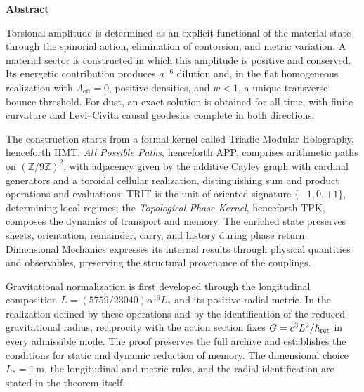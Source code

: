
\begin{center}\bfseries Abstract\end{center}
\begingroup
\fontsize{9.5}{10.7}\selectfont
\setlength{\parskip}{1.5pt plus .5pt minus .5pt}
\noindent
Torsional amplitude is determined as an explicit functional of the
material state through the spinorial action, elimination of contorsion,
and metric variation. A material sector is constructed in which this
amplitude is positive and conserved. Its energetic contribution produces
\(a^{-6}\) dilution and, in the flat homogeneous realization with
\(\Lambda_{\mathrm{eff}}=0\), positive densities, and \(w<1\), a unique
transverse bounce threshold. For dust, an exact solution is obtained for
all time, with finite curvature and Levi--Civita causal geodesics complete
in both directions.

The construction starts from a formal kernel called Triadic Modular
Holography, henceforth HMT. \emph{All Possible Paths}, henceforth APP,
comprises arithmetic paths on \((\mathbb Z/9\mathbb Z)^2\), with
adjacency given by the additive Cayley graph with cardinal generators
and a toroidal cellular realization, distinguishing sum and product
operations and evaluations; TRIT is the unit
of oriented signature \(\{-1,0,+1\}\), determining local regimes; the
\emph{Topological Phase Kernel}, henceforth TPK, composes the dynamics of
transport and memory. The enriched state preserves sheets, orientation,
remainder, carry, and history during phase return. Dimensional Mechanics
expresses its internal results through physical quantities and
observables, preserving the structural provenance of the couplings.

Gravitational normalization is first developed through the longitudinal
composition \(L=(5759/23040)\alpha^{16}L_*\) and its positive radial
metric. In the realization defined by these operations and by the
identification of the reduced gravitational radius, reciprocity with the
action section fixes \(G=c^3L^2/\hbar_{\rm ret}\) in every admissible
mode. The proof preserves the full archive and establishes the conditions
for static and dynamic reduction of memory. The dimensional choice
\(L_*=1\,\mathrm m\), the longitudinal and metric rules, and the
radial identification are stated in the theorem itself.

